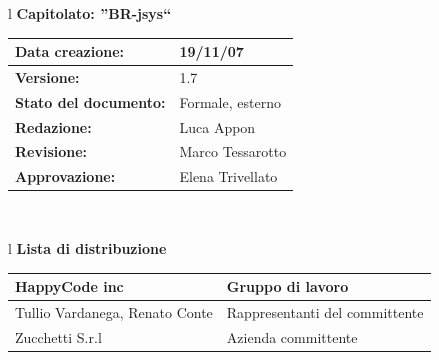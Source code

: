 \documentclass[11pt,titlepage,a4paper]{report}
\begin{document}
\begin{center}
\thispagestyle{plain}
\begin{table}[htbp]
\large{
\begin{tabular}{l}
\Large{\textbf{\textsf{Capitolato: ''BR-jsys``}}} \\
\begin{tabular}{||p{6cm}||p{6cm}||} \hline
\textbf{Data creazione:} & 19/11/07 \\ \hline
\textbf{Versione:} & 1.7 \\ \hline
\textbf{Stato del documento:} & Formale, esterno \\ \hline
\textbf{Redazione:} & Luca Appon \\ \hline
\textbf{Revisione:} & Marco Tessarotto   \\ \hline
\textbf{Approvazione:}  & Elena Trivellato\\ \hline
\end{tabular} \\
\end{tabular}
}
\end{table}

\begin{table}[hbtp]
\large{
\begin{tabular}{l}
\Large{\textbf{\textsf{Lista di distribuzione}}} \\
\begin{tabular}{||p{6cm}||p{6cm}||} \hline
{HappyCode inc}& Gruppo di lavoro\\ \hline
{Tullio Vardanega, Renato Conte}& Rappresentanti del committente \\ \hline
{Zucchetti S.r.l}& Azienda committente\\ \hline
\end{tabular} \\
\end{tabular}
}
\end{table}


\end{center}
\end{document}
